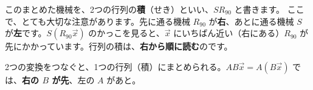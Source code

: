 このまとめた機械を、2つの行列の\textbf{積}（せき）といい、$SR_{90}$ と書きます。
ここで、とても大切な注意があります。先に通る機械 $R_{90}$ が\textbf{右}、あとに通る機械 $S$ が\textbf{左}です。$S(R_{90}\vec x)$ のかっこを見ると、$\vec x$ にいちばん近い（右にある）$R_{90}$ が先にかかっています。行列の積は、\textbf{右から順に読む}のです。

\begin{taisetsu}
2つの変換をつなぐと、1つの行列（積）にまとめられる。$AB\vec x=A(B\vec x)$ では、\textbf{右の $B$ が先}、左の $A$ があと。
\end{taisetsu}

\label{bk:7-3:kimekata}

